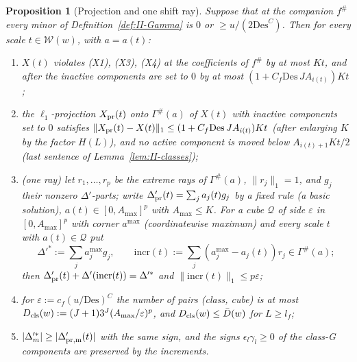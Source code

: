 \documentclass[10pt]{amsart}
\newtheorem{proposition}[theorem]{Proposition}
\theoremstyle{definition}
\theoremstyle{remark}
\begin{document}
\begin{proposition}[Projection and one shift ray]\label{prop:II-ray}
Suppose that at the companion $f^\#$ every minor of Definition~\textup{\ref{def:II-Gamma}}
is $0$ or $\ge u/(2\mathrm{Des}^C)$.  Then for every scale $t\in\mathcal W(w)$, with
$a=a(t)$:
\begin{enumerate}
\item[(a)] $X(t)$ violates \textup{(X1)}, \textup{(X3)}, \textup{(X4)} at the
coefficients of $f^\#$ by at most $Kt$, and after the inactive components
are set to $0$ by at most $(1+C_f\mathrm{Des}\,JA_{i(t)})Kt$;
\item[(b)] the $\ell_1$-projection $X_{\rm pr}(t)$ onto $\Gamma^\#(a)$ of $X(t)$
with inactive components set to $0$ satisfies $\|X_{\rm pr}(t)-X(t)\|_1\le
(1+C_f\mathrm{Des}\,JA_{i(t)})Kt$ \textup{(}after enlarging $K$ by the factor
$H(L)$\textup{)}, and no active component is moved below $A_{i(t)+1}Kt/2$
\textup{(}last sentence of Lemma~\textup{\ref{lem:II-classes})};
\item[(c)] \textup{(one ray)} let $r_1,\dots,r_p$ be the extreme rays of $\Gamma^\#(a)$,
$\|r_j\|_1=1$, and $g_j$ their nonzero $\Delta'$-parts; write $\Delta'_{\rm pr}(t)=\sum_j
a_j(t)g_j$ by a fixed rule \textup{(}a basic solution\textup{)}, $a(t)\in[0,A_{\max}]^p$
with $A_{\max}\le K$.  For a cube $\mathcal Q$ of side $\varepsilon$ in $[0,A_{\max}]^p$
with corner $a^{\max}$ \textup{(}coordinatewise maximum\textup{)} and every scale $t$ with
$a(t)\in\mathcal Q$ put
\[
 \Delta'^*:=\sum_ja^{\max}_jg_j,\qquad\mathrm{incr}(t):=\sum_j(a^{\max}_j-a_j(t))r_j\in
 \Gamma^\#(a);
\]
then $\Delta'_{\rm pr}(t)+\Delta'(\mathrm{incr}(t))=\Delta'^*$ and $\|\mathrm{incr}(t)\|_1\le
p\varepsilon$;
\item[(d)] for $\varepsilon:=c_f(u/\mathrm{Des})^C$ the number of pairs \textup{(}class,
cube\textup{)} is at most $D_{\rm cls}(w):=(J+1)3^J(A_{\max}/\varepsilon)^p$, and
$D_{\rm cls}(w)\le\bar D(w)$ for $L\ge l_f$;
\item[(e)] $|\Delta'^*_m|\ge|\Delta'_{\rm pr,m}(t)|$ with the same sign, and the signs
$\epsilon_l\gamma_l\ge0$ of the class-G components are preserved by the increments.
\end{enumerate}
\end{proposition}
\end{document}
